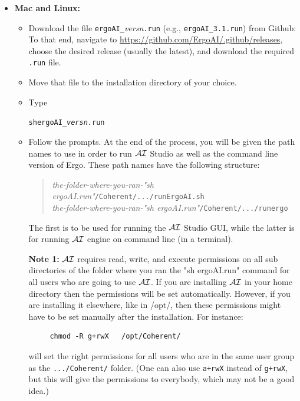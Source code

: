 \documentclass[11pt]{article}
\newcommand{\ERGOAI}{\mbox{\smaller{\ensuremath{\cal{E}}\smaller{{\sc{RGO}}}}\ensuremath{\cal{AI}}}\xspace}
\begin{document}
\begin{itemize}
\item[] \textbf{Mac and Linux:}  
  \begin{itemize}
  \item  Download the file \texttt{ergoAI\_}\textnormal{\textit{versn}}\texttt{.run}
    (e.g., \verb|ergoAI_3.1.run|) from Github:\\
    To that end, navigate to
    \url{https://github.com/ErgoAI/.github/releases}, 
    choose the desired release (usually the latest), and download the
    required \texttt{.run} file. 
  \item Move that file to the installation directory of your choice.
  \item Type
\begin{alltt}
    sh ergoAI\_\textnormal{\it{}versn}.run 
\end{alltt}
  \item Follow the prompts. At the end of the process, you will be given
    the path names to use in order to run \ERGOAI Studio as well as the
    command line version of Ergo. These path names have the following
    structure:
    \begin{quote}
      \emph{the-folder-where-you-ran-"sh ergoAI.run"}\texttt{/Coherent/.../runErgoAI.sh}\\
      \emph{the-folder-where-you-ran-"sh ergoAI.run"}\texttt{/Coherent/.../runergo}
    \end{quote}
    The first is to be used for running the \ERGOAI Studio GUI, while the
    latter is for running \ERGOAI engine on command line (in a terminal).

    \textbf{Note 1:} \ERGOAI requires read, write, and execute permissions
    on all sub directories of the folder where you ran the "sh ergoAI.run"
    command for all users who are going to use \ERGOAI. If
    you are installing \ERGOAI in your home directory then the permissions
    will be set automatically. However, if you are installing it elsewhere,
    like in /opt/, then these permissions might have to be set manually
    after the installation. For instance:
\begin{verbatim}
     chmod -R g+rwX   /opt/Coherent/ 
\end{verbatim}
    will set the right permissions for all users who are in the same user
    group as the \texttt{.../Coherent/} folder.  (One can also use
    \texttt{a+rwX} instead of \texttt{g+rwX}, but this will give the
    permissions to everybody, which may not be a good idea.)


\end{itemize}
\end{itemize}
\end{document}
